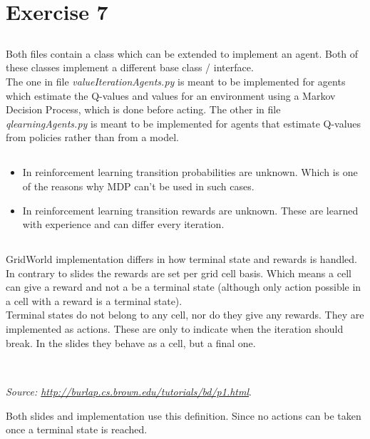 \section{Exercise 7}
\subsection{}
Both files contain a class which can be extended to implement an agent. Both of these classes implement a different base class / interface. \\
The one in file \textit{valueIterationAgents.py} is meant to be implemented for agents which estimate the Q-values and values for an environment using a Markov Decision Process, which is done before acting.
The other in file \textit{qlearningAgents.py}  is meant to be implemented for agents that estimate Q-values from policies rather than from a model.

\subsection{}
\begin{itemize}
  \item In reinforcement learning transition probabilities are unknown. Which is one of the reasons why MDP can't be used in such cases.
  \item In reinforcement learning transition rewards are unknown. These are learned with experience and can differ every iteration.
\end{itemize}

\subsection{}
GridWorld implementation differs in how terminal state and rewards is handled. In contrary to slides the rewards are set per grid cell basis. Which means a cell can give a reward and not a be a terminal state (although only action possible in a cell with a reward is a terminal state). \\
Terminal states do not belong to any cell, nor do they give any rewards. They are implemented as actions. These are only to indicate when the iteration should break. In the slides they behave as a cell, but a final one.

\subsection{}
\textit{}\\
\textit{Source: \url{http://burlap.cs.brown.edu/tutorials/bd/p1.html}}. \smallskip

Both slides and implementation use this definition. Since no actions can be taken once a terminal state is reached.
